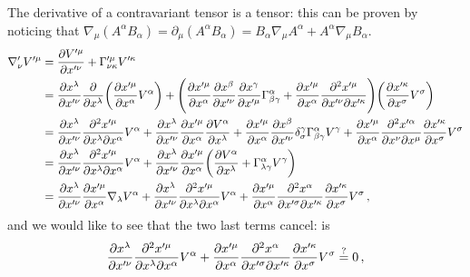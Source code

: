 \documentclass[main.tex]{subfiles}
\begin{document}
The derivative of a contravariant tensor is a tensor: this can be proven by noticing that \(\nabla_\mu (A^{\alpha }B_{\alpha }) = \partial_\mu (A^{\alpha }B_{\alpha }) = B_{\alpha } \nabla_{\mu }A^{\alpha } + A^{\alpha }\nabla_{\mu }B_{\alpha }\). 
%
\begin{subequations}
\begin{align}
  \nabla_{\nu }' V^{\prime \mu }  &= \pdv{V^{\prime \mu }}{x^{\prime \nu }} + \Gamma^{\prime \mu }_{\nu \kappa }V^{\prime \kappa }  \\
  &= \pdv{x^{\lambda }}{x^{\prime \nu }} \pdv{}{x^{\lambda }} \qty(\pdv{x^{\prime \mu }}{x^{\alpha }} V^{\alpha }) 
  +   \qty(\pdv{x^{\prime \mu }}{x^{\alpha }} \pdv{x^{\beta }}{x^{\prime \nu }} \pdv{x^{\gamma }}{x^{\prime \mu }} \Gamma^{\alpha }_{\beta \gamma } 
  + \pdv{x^{\prime \mu }}{x^{\alpha }} \pdv[2]{x^{\prime \mu }}{x^{\prime \nu }}{x^{\prime \kappa }}) \qty(\pdv{x^{\prime \kappa }}{x^{\sigma }} V^{\sigma })  \\
  &= \pdv{x^{\lambda }}{x^{\prime \nu }} \pdv[2]{x^{\prime \mu }}{x^{\lambda }}{x^{\alpha }} V^{\alpha }
  + \pdv{x^{\lambda }}{x^{\prime \nu }} \pdv{x^{\prime \mu }}{x^{\alpha }} \pdv{V^{\alpha }}{x^{\lambda }}
  + \pdv{x^{\prime \mu }}{x^{\alpha }} \pdv{x^{\beta }}{x^{\prime \nu }} \delta^{\gamma}_{\sigma } \Gamma^{\alpha }_{\beta \gamma } V^{\gamma }+ \pdv{x^{\prime \mu }}{x^{\alpha }} \pdv[2]{x^{\prime \alpha }}{x^{\nu }}{x^{\mu }} \pdv{x^{\prime \kappa }}{x^{\sigma}} V^{\sigma }    \\
  &= \pdv{x^{\lambda }}{x^{\prime \nu }} \pdv[2]{x^{\prime \mu }}{x^{\lambda }}{x^{\alpha }} V^{\alpha }
  + \pdv{x^{\lambda }}{x^{\prime \nu }} \pdv{x^{\prime \mu }}{x^{\alpha }} \qty(\pdv{V^{\alpha }}{x^{\lambda }} + \Gamma^{\alpha }_{\lambda \gamma } V^{\gamma })  \\
  & = \pdv{x^{\lambda }}{x^{\prime \nu }} \pdv{x^{\prime \mu }}{x^{\alpha }} \nabla_{\lambda }V^{\alpha }
  + \pdv{x^{\lambda }}{x^{\prime \nu }} \pdv[2]{x^{\prime \mu }}{x^{\lambda }}{x^{\alpha }}V^{\alpha }
  + \pdv{x^{\prime \mu }}{x^{\alpha }} \pdv[2]{x^{ \alpha }}{x^{\prime \sigma }}{x^{\prime \kappa }} \pdv{x^{\prime \kappa }}{x^{ \sigma }} V^{\sigma }  
  \,,
\end{align}
\end{subequations}
%
and we would like to see that the two last terms cancel: is 
%
\begin{equation}
    \pdv{x^{\lambda }}{x^{\prime \nu }} \pdv[2]{x^{\prime \mu }}{x^{\lambda }}{x^{\alpha }}V^{\alpha }
    + \pdv{x^{\prime \mu }}{x^{\alpha }} \pdv[2]{x^{ \alpha }}{x^{\prime \sigma }}{x^{\prime \kappa }} \pdv{x^{\prime \kappa }}{x^{ \sigma }} V^{\sigma }  \overset{?}{=} 0 
\,,
\end{equation}
\end{document}
